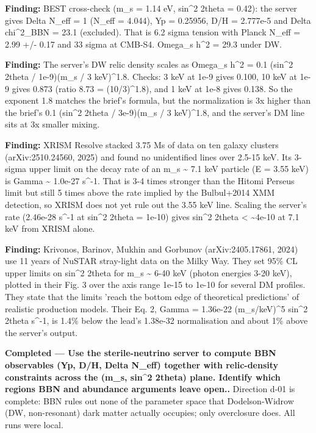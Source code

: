 \documentclass[11pt,a4paper]{article}
\begin{document}
\textbf{Finding:} BEST cross-check (m\_s = 1.14 eV, sin\textasciicircum{}2 2theta = 0.42): the server gives Delta N\_eff = 1 (N\_eff = 4.044), Yp = 0.25956, D/H = 2.777e-5 and Delta chi\textasciicircum{}2\_BBN = 23.1 (excluded). That is 6.2 sigma tension with Planck N\_eff = 2.99 +/- 0.17 and 33 sigma at CMB-S4. Omega\_s h\textasciicircum{}2 = 29.3 under DW.

\textbf{Finding:} The server's DW relic density scales as Omega\_s h\textasciicircum{}2 = 0.1 (sin\textasciicircum{}2 2theta / 1e-9)(m\_s / 3 keV)\textasciicircum{}1.8. Checks: 3 keV at 1e-9 gives 0.100, 10 keV at 1e-9 gives 0.873 (ratio 8.73 = (10/3)\textasciicircum{}1.8), and 1 keV at 1e-8 gives 0.138. So the exponent 1.8 matches the brief's formula, but the normalization is 3x higher than the brief's 0.1 (sin\textasciicircum{}2 2theta / 3e-9)(m\_s / 3 keV)\textasciicircum{}1.8, and the server's DM line sits at 3x smaller mixing.

\textbf{Finding:} XRISM Resolve stacked 3.75 Ms of data on ten galaxy clusters (arXiv:2510.24560, 2025) and found no unidentified lines over 2.5-15 keV. Its 3-sigma upper limit on the decay rate of an m\_s \textasciitilde{} 7.1 keV particle (E = 3.55 keV) is Gamma \textasciitilde{} 1.0e-27 s\textasciicircum{}-1. That is 3-4 times stronger than the Hitomi Perseus limit but still 5 times above the rate implied by the Bulbul+2014 XMM detection, so XRISM does not yet rule out the 3.55 keV line. Scaling the server's rate (2.46e-28 s\textasciicircum{}-1 at sin\textasciicircum{}2 2theta = 1e-10) gives sin\textasciicircum{}2 2theta \textless{} \textasciitilde{}4e-10 at 7.1 keV from XRISM alone.

\textbf{Finding:} Krivonos, Barinov, Mukhin and Gorbunov (arXiv:2405.17861, 2024) use 11 years of NuSTAR stray-light data on the Milky Way. They set 95\% CL upper limits on sin\textasciicircum{}2 2theta for m\_s \textasciitilde{} 6-40 keV (photon energies 3-20 keV), plotted in their Fig. 3 over the axis range 1e-15 to 1e-10 for several DM profiles. They state that the limits 'reach the bottom edge of theoretical predictions' of realistic production models. Their Eq. 2, Gamma = 1.36e-22 (m\_s/keV)\textasciicircum{}5 sin\textasciicircum{}2 2theta s\textasciicircum{}-1, is 1.4\% below the lead's 1.38e-32 normalisation and about 1\% above the server's output.

\textbf{Completed --- Use the sterile-neutrino server to compute BBN observables (Yp, D/H, Delta N\_eff) together with relic-density constraints across the (m\_s, sin\textasciicircum{}2 2theta) plane. Identify which regions BBN and abundance arguments leave open..} Direction d-01 is complete: BBN rules out none of the parameter space that Dodelson-Widrow (DW, non-resonant) dark matter actually occupies; only overclosure does. All runs were local.
\end{document}
